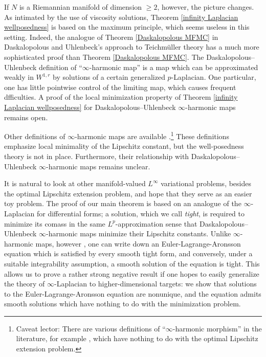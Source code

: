 \documentclass[reqno,11pt]{amsart}
\newcommand{\dfn}[1]{\emph{#1}\index{#1}}
\theoremstyle{definition}
\numberwithin{equation}{section}
\begin{document}
If $N$ is a Riemannian manifold of dimension $\geq 2$, however, the picture changes.
As intimated by the use of viscosity solutions, Theorem \ref{infinity Laplacian wellposedness} is based on the maximum principle, which seems useless in this setting.
Indeed, the analogue of Theorem \ref{Daskalopolous MFMC} in Daskalopolous and Uhlenbeck's approach to Teichm\"uller theory \cite{daskalopoulos2022,daskalopoulos2023} has a much more sophisticated proof than Theorem \ref{Daskalopolous MFMC}.
The Daskalopolous--Uhlenbeck definition of ``$\infty$-harmonic map'' is a map which can be approximated weakly in $W^{1, r}$ by solutions of a certain generalized $p$-Laplacian.
One particular, one has little pointwise control of the limiting map, which causes frequent dfficulties.
A proof of the local minimization property of Theorem \ref{infinity Laplacian wellposedness} for Daskalopolous--Uhlenbeck $\infty$-harmonic maps remains open.

Other definitions of $\infty$-harmonic maps are available \cite{Sheffield12}.\footnote{Caveat lector: There are various definitions of ``$\infty$-harmonic morphism'' in the literature, for example \cite{Ou12}, which have nothing to do with the optimal Lipschitz extension problem.}
These definitions emphasize local minimality of the Lipschitz constant, but the well-posedness theory is not in place.
Furthermore, their relationship with Daskalopolous--Uhlenbeck $\infty$-harmonic maps remains unclear.

It is natural to look at other manifold-valued $L^\infty$ variational problems, besides the optimal Lipschitz extension problem, and hope that they serve as an easier toy problem.
The proof of our main theorem is based on an analogue of the $\infty$-Laplacian for differential forms; a solution, which we call \dfn{tight}, is required to minimize its comass in the same $L^p$-approximation sense that Daskalopolous--Uhlenbeck $\infty$-harmonic maps minimize their Lipschitz constants.
Unlike $\infty$-harmonic maps, however \cite{Sheffield12}, one can write down an Euler-Lagrange-Aronsson equation which is satisfied by every smooth tight form, and conversely, under a suitable integrability assumption, a smooth solution of the equation is tight.
This allows us to prove a rather strong negative result if one hopes to easily generalize the theory of $\infty$-Laplacian to higher-dimensional targets: we show that solutions to the Euler-Lagrange-Aronsson equation are nonunique, and the equation admits smooth solutions which have nothing to do with the minimization problem.
\end{document}

